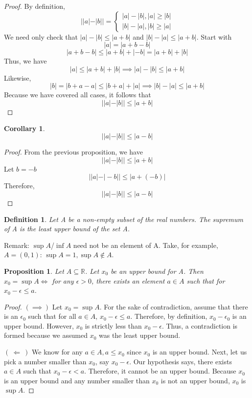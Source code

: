 \documentclass[12pt,reqno]{amsart}
\theoremstyle{plain}
\newtheorem*{definition}{Definition}
\newtheorem*{corollary}{Corollary}
\newtheorem*{proposition}{Proposition}
\begin{document}
    \begin{proof}
        By definition, 
        \[ ||a| - |b|| = 
        \begin{cases}
            |a| - |b|, |a| \ge |b| \\
            |b| - |a|, |b| \ge |a|
        \end{cases}\]
        We need only check that $|a| - |b| \le |a+b|$ and $|b| - |a| \le |a+b|$.
        Start with
        \[ |a| = |a + b - b| \]
        \[ |a + b - b| \le |a + b| + |-b| = |a + b| + |b| \]
        Thus, we have
        \[ |a| \le |a + b| + |b| \implies |a| - |b| \le |a + b| \]
        Likewise,
        \[ |b| = |b+a-a| \le |b+a| + |a| \implies |b|-|a| \le |a+b|\]
        Because we have covered all cases, it follows that
        \[ ||a| - |b|| \le |a+b| \]
    \end{proof}

    \begin{corollary}
        \[ ||a| - |b|| \le |a-b| \]
    \end{corollary}
    \begin{proof}
        From the previous proposition, we have
        \[ ||a| - |b|| \le |a+b| \]
        Let $b = -b$
        \[ ||a| - |-b|| \le |a+(-b)|\]
        Therefore,
        \[ ||a| - |b|| \le |a-b|\]
    \end{proof}

    \pagebreak

    \begin{definition}
        Let A be a non-empty subset of the real numbers. The supremum of A is the least upper bound of the set A.
    \end{definition}

    Remark: $\sup{A}$/$\inf{A}$ need not be an element of A. Take, for example, $A = (0,1)$: $\sup{A} = 1, \sup{A} \not \in A$.

    \begin{proposition}
        Let $A \subseteq \mathbb{R}$. Let $x_0$ be an upper bound for A. 
        Then $x_0 = \sup{A} \iff $ for any $ \epsilon > 0$, there exists an element $a \in A$ such that for $x_0 - \epsilon \le a$.
    \end{proposition}

    \begin{proof} 
        $(\implies)$ 
        Let $x_0 = \sup{A}$. For the sake of contradiction, assume that there is an $\epsilon_0$ such that for all $a \in A$, $x_0 - \epsilon \le a$.
        Therefore, by definition, $x_0 - \epsilon_0$ is an upper bound. 
        However, $x_0$ is strictly less than $x_0 - \epsilon$.
        Thus, a contradiction is formed because we assumed $x_0$ was the least upper bound.

        $(\ \Longleftarrow \ )$ We know for any $a \in A, a \le x_0$ since $x_0$ is an upper bound.
        Next, let us pick a number smaller than $x_0$, say $x_0 - \epsilon$. 
        Our hypothesis says, there exists $a \in A$ such that $x_0 - \epsilon < a$.
        Therefore, it cannot be an upper bound. Because $x_0$ is an upper bound and any number smaller than $x_0$ is not an upper bound, $x_0$ is $\sup{A}$.
    \end{proof}
\end{document}
